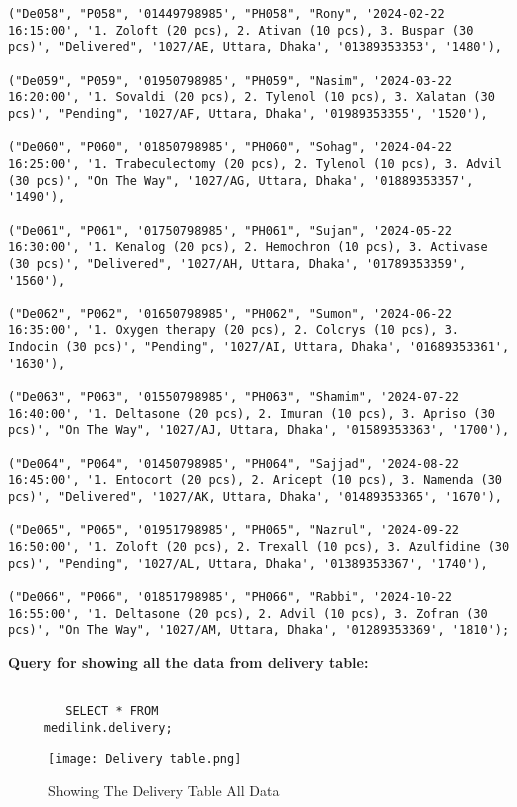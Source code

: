 \documentclass[11pt]{article}
\begin{document}
\begin{lstlisting}
("De058", "P058", '01449798985', "PH058", "Rony", '2024-02-22 16:15:00', '1. Zoloft (20 pcs), 2. Ativan (10 pcs), 3. Buspar (30 pcs)', "Delivered", '1027/AE, Uttara, Dhaka', '01389353353', '1480'),

("De059", "P059", '01950798985', "PH059", "Nasim", '2024-03-22 16:20:00', '1. Sovaldi (20 pcs), 2. Tylenol (10 pcs), 3. Xalatan (30 pcs)', "Pending", '1027/AF, Uttara, Dhaka', '01989353355', '1520'),

("De060", "P060", '01850798985', "PH060", "Sohag", '2024-04-22 16:25:00', '1. Trabeculectomy (20 pcs), 2. Tylenol (10 pcs), 3. Advil (30 pcs)', "On The Way", '1027/AG, Uttara, Dhaka', '01889353357', '1490'),

("De061", "P061", '01750798985', "PH061", "Sujan", '2024-05-22 16:30:00', '1. Kenalog (20 pcs), 2. Hemochron (10 pcs), 3. Activase (30 pcs)', "Delivered", '1027/AH, Uttara, Dhaka', '01789353359', '1560'),

("De062", "P062", '01650798985', "PH062", "Sumon", '2024-06-22 16:35:00', '1. Oxygen therapy (20 pcs), 2. Colcrys (10 pcs), 3. Indocin (30 pcs)', "Pending", '1027/AI, Uttara, Dhaka', '01689353361', '1630'),

("De063", "P063", '01550798985', "PH063", "Shamim", '2024-07-22 16:40:00', '1. Deltasone (20 pcs), 2. Imuran (10 pcs), 3. Apriso (30 pcs)', "On The Way", '1027/AJ, Uttara, Dhaka', '01589353363', '1700'),

("De064", "P064", '01450798985', "PH064", "Sajjad", '2024-08-22 16:45:00', '1. Entocort (20 pcs), 2. Aricept (10 pcs), 3. Namenda (30 pcs)', "Delivered", '1027/AK, Uttara, Dhaka', '01489353365', '1670'),

("De065", "P065", '01951798985', "PH065", "Nazrul", '2024-09-22 16:50:00', '1. Zoloft (20 pcs), 2. Trexall (10 pcs), 3. Azulfidine (30 pcs)', "Pending", '1027/AL, Uttara, Dhaka', '01389353367', '1740'),

("De066", "P066", '01851798985', "PH066", "Rabbi", '2024-10-22 16:55:00', '1. Deltasone (20 pcs), 2. Advil (10 pcs), 3. Zofran (30 pcs)', "On The Way", '1027/AM, Uttara, Dhaka', '01289353369', '1810');
\end{lstlisting}

\newline

\textbf{Query for showing all the data from delivery table: 
}
\begin{lstlisting}

        SELECT * FROM 
     medilink.delivery;
\end{lstlisting}
\begin{figure}[H]
    \centering
    \texttt{[image: Delivery table.png]}
    \caption{Showing The Delivery Table All Data}
    \label{fig:1}
\end{figure}
\end{document}
